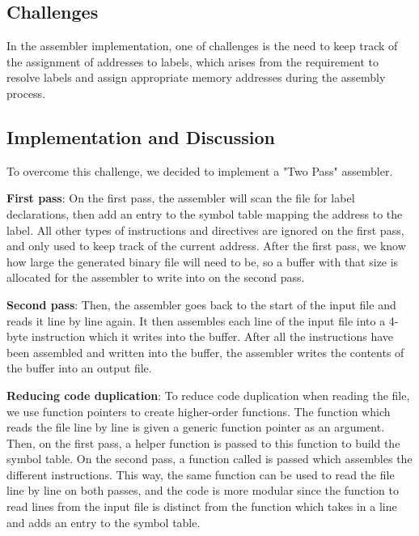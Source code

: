 \documentclass{article}
\begin{document}
\begin{adjustwidth}{2em}{0pt}
        \subsection{Challenges}
        In the assembler implementation, one of challenges is the need to
keep track of the assignment of addresses to labels, which arises from the requirement to resolve labels and assign
appropriate memory addresses during the assembly process.
        
        \subsection{Implementation and Discussion}
        
            To overcome this challenge, we decided to implement a "Two Pass" assembler.
            
            \textbf{First pass}: On the first pass, the assembler will scan the file for label declarations, then add an entry to the symbol table mapping the address to the label. All other types of instructions and directives are ignored on the first pass, and only used to keep track of the current address. After the first pass, we know how large the generated binary file will need to be, so a buffer with that size is allocated for the assembler to write into on the second pass. 
        
            \textbf{Second pass}: Then, the assembler goes back to the start of the input file and reads it line by line again. It then assembles each line of the input file into a 4-byte instruction which it writes into the buffer. After all the instructions have been assembled and written into the buffer, the assembler writes the contents of the buffer into an output file.
            
            \textbf{Reducing code duplication}: To reduce code duplication when reading the file, we use function pointers to create higher-order functions. The function which reads the file line by line is given a generic function pointer as an argument. Then, on the first pass, a helper function is passed to this function to build the symbol table. On the second pass, a function called is passed which assembles the different instructions. This way, the same function can be used to read the file line by line on both passes, and the code is more modular since the function to read lines from the input file is distinct from the function which takes in a line and adds an entry to the symbol table.
            
        \end{adjustwidth}
    
\end{document}
